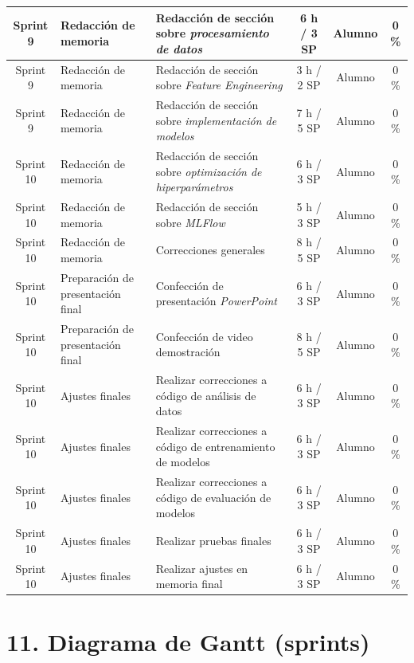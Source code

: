 \documentclass[
11pt, %
]{charter}
\begin{document}
\begin{xltabular}{\linewidth}{@{}|c|X|X|c|c|c|@{}}
Sprint 9 & Redacción de memoria  & Redacción de sección sobre \textit{procesamiento de datos}  & 6 h / 3 SP & Alumno & 0 \% \\ \hline
Sprint 9 & Redacción de memoria  & Redacción de sección sobre \textit{Feature Engineering}  & 3 h / 2 SP & Alumno & 0 \% \\ \hline
Sprint 9 & Redacción de memoria  & Redacción de sección sobre \textit{implementación de modelos}  & 7 h / 5 SP & Alumno & 0 \% \\ \hline
Sprint 10 & Redacción de memoria  & Redacción de sección sobre \textit{optimización de hiperparámetros}  & 6 h / 3 SP & Alumno & 0 \% \\ \hline
Sprint 10 & Redacción de memoria  & Redacción de sección sobre \textit{MLFlow}  & 5 h / 3 SP & Alumno & 0 \% \\ \hline
Sprint 10 & Redacción de memoria  & Correcciones generales  & 8 h / 5 SP & Alumno & 0 \% \\ \hline
Sprint 10 & Preparación de presentación final  & Confección de presentación \textit{PowerPoint}  & 6 h / 3 SP & Alumno & 0 \%\\ \hline
Sprint 10 & Preparación de presentación final  & Confección de video demostración  & 8 h / 5 SP & Alumno & 0 \%\\ \hline
Sprint 10 & Ajustes finales & Realizar correcciones a código de análisis de datos & 6 h / 3 SP & Alumno & 0 \%\\ \hline
Sprint 10 & Ajustes finales & Realizar correcciones a código de entrenamiento de modelos & 6 h / 3 SP & Alumno & 0 \%\\ \hline
Sprint 10 & Ajustes finales & Realizar correcciones a código de evaluación de modelos & 6 h / 3 SP & Alumno & 0 \%\\ \hline
Sprint 10 & Ajustes finales & Realizar pruebas finales & 6 h / 3 SP & Alumno & 0 \%\\ \hline
Sprint 10 & Ajustes finales & Realizar ajustes en memoria final & 6 h / 3 SP & Alumno & 0 \%\\ \hline
\end{xltabular}

\section{11. Diagrama de Gantt (sprints)}
\label{sec:gantt}

\end{document}
